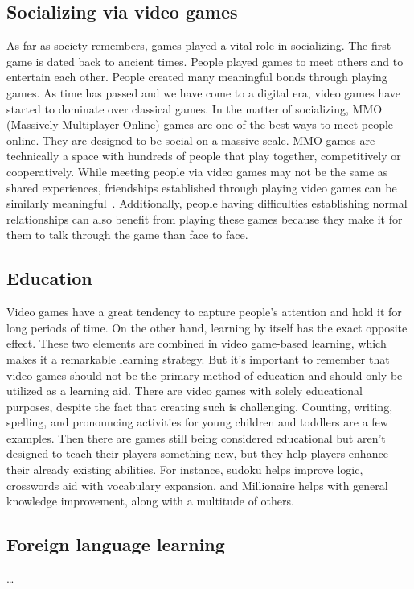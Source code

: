 \documentclass[10pt,twoside,english,a4paper]{article}
\begin{document}
\subsection{Socializing via video games}
As far as society remembers, games played a vital role in socializing. The first game is dated back to ancient times. People played games to meet others and to entertain each other. People created many meaningful bonds through playing games. As time has passed and we have come to a digital era, video games have started to dominate over classical games. In the matter of socializing, MMO (Massively Multiplayer Online) games are one of the best ways to meet people online. They are designed to be social on a massive scale. MMO games are technically a space with hundreds of people that play together, competitively or cooperatively. While meeting people via video games may not be the same as shared experiences, friendships established through playing video games can be similarly meaningful~\cite{poz-neg-sol}. Additionally, people having difficulties establishing normal relationships can also benefit from playing these games because they make it for them to talk through the game than face to face.

\subsection{Education}
Video games have a great tendency to capture people's attention and hold it for long periods of time. On the other hand, learning by itself has the exact opposite effect. These two elements are combined in video game-based learning, which makes it a remarkable learning strategy. But it's important to remember that video games should not be the primary method of education and should only be utilized as a learning aid. There are video games with solely educational purposes, despite the fact that creating such is challenging. Counting, writing, spelling, and pronouncing activities for young children and toddlers are a few examples. Then there are games still being considered educational but aren't designed to teach their players something new, but they help players enhance their already existing abilities. For instance, sudoku helps improve logic, crosswords aid with vocabulary expansion, and Millionaire helps with general knowledge improvement, along with a multitude of others.

\subsection{Foreign language learning}
\ldots
\end{document}
